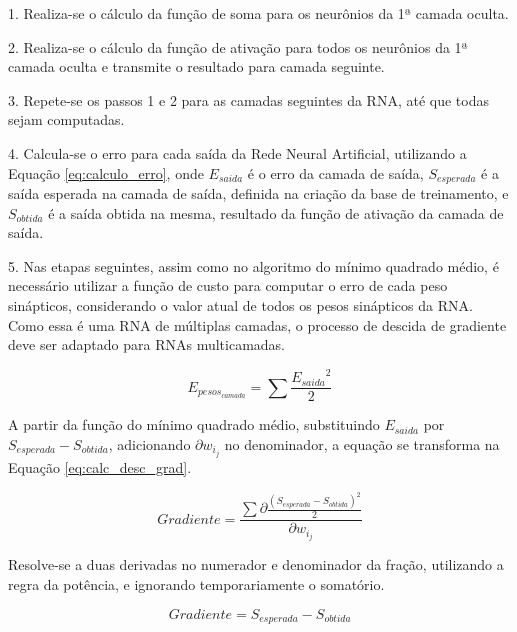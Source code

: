 \documentclass[12pt,oneside,a4paper,chapter=TITLE,section=TITLE,sumario
		=tradicional]{abntex2}
\begin{document}
		\begin{lista}
			\item[1.] Realiza-se o cálculo da função de soma para os neurônios da 1ª camada oculta.
			
			\item[2.] Realiza-se o cálculo da função de ativação para todos os neurônios da 1ª camada oculta e transmite o resultado para camada seguinte.
			
			\item[3.] Repete-se os passos 1 e 2 para as camadas seguintes da RNA, até que todas sejam computadas.
			
			\item[4.] Calcula-se o erro para cada saída da Rede Neural Artificial, utilizando a Equação \ref{eq:calculo_erro}, onde $E_{saida}$ é o erro da camada de saída, $S_{esperada}$ é a saída esperada na camada de saída, definida na criação da base de treinamento, e $S_{obtida}$ é a saída obtida na mesma, resultado da função de ativação da camada de saída.	
			
			\item[5.] Nas etapas seguintes, assim como no algoritmo do mínimo quadrado médio, é necessário utilizar a função de custo para computar o erro de cada peso sinápticos, considerando o valor atual de todos os pesos sinápticos da RNA. Como essa é uma RNA de múltiplas camadas, o processo de descida de gradiente deve ser adaptado para RNAs multicamadas.
			
			\begin{equation}
			\label{eq:funcao_minimo2}
			E_{pesos_{camada}} = \sum{\frac{ {E_{saida}}^2}{2}}
			\end{equation}
			
			A partir da função do mínimo quadrado médio,  substituindo $E_{saida}$ por $S_{esperada} - S_{obtida}$, adicionando $\partial{w_{i_{j}}}$ no denominador, a equação se transforma na Equação \ref{eq:calc_desc_grad}.
			
			\begin{equation}
			\label{eq:funcao_minimo3}
			Gradiente = \frac{\sum{\partial{\frac{ {(S_{esperada} - S_{obtida})}^2}{2}}}}{\partial{w_{i_{j}}}}
			\end{equation}
			
			Resolve-se a duas derivadas no numerador e denominador da fração, utilizando a regra da potência, e ignorando temporariamente o somatório.
			
			\begin{equation}
			\label{eq:funcao_minimo4}
			Gradiente = S_{esperada} - S_{obtida}
			\end{equation}
			

\end{lista}
\end{document}
